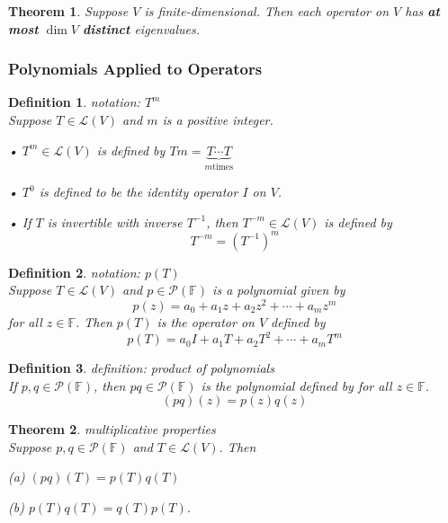 \documentclass{article}
\newtheorem{theorem}{Theorem}[subsection]
\newtheorem{definition}{Definition}[subsection]
\newcommand{\FF}{\mathbb{F}}
\begin{document}
\begin{CJK}{UTF8}{gkai}
\begin{theorem}
    Suppose $V$ is finite-dimensional. Then each operator on $V$ has \textbf{at most} $\dim V$ \textbf{distinct} eigenvalues.
\end{theorem}
\subsubsection{Polynomials Applied to Operators}

\begin{definition}
    notation: $T^m$\\

    Suppose $T \in \mathcal{L}(V)$ and $m$ is a positive integer.

    • $T^m \in\mathcal{L}(V)$ is defined by $Tm = \underset{m \text{times}}{\underbrace{T\cdots T}}$

    • $T^0$ is defined to be the identity operator $I$ on $V$.

    • If $T$ is invertible with inverse $T^{-1}$, then $T^{-m} \in \mathcal{L}(V)$ is defined by
    \[T^{-m} = (T^{-1})^{m}\]
\end{definition}

\begin{definition}
    notation: $p(T)$\\

    Suppose $T \in \mathcal{L}(V)$ and $p \in \mathcal{P}(\FF)$ is a polynomial given by
    \[p(z) = a_0 +a_1 z + a_2 z^2 +\cdots +a_m z^m\]
    for all $z \in \FF$. Then $p(T)$ is the operator on $V$ defined by
    \[p(T) = a_0 I +a_1 T+a_2 T^2 +\cdots +a_m T^m\]
\end{definition}

\begin{definition}
    definition: product of polynomials\\

    If $p, q \in \mathcal{P}(\FF)$, then $pq \in \mathcal{P}(\FF)$ is the polynomial defined by for all $z \in \FF$.
    \[(pq)(z) = p(z)q(z)\]
\end{definition}

\begin{theorem}
    multiplicative properties\\

    Suppose $p,q \in \mathcal{P}(\FF)$ and $T \in \mathcal{L}(V)$. Then

    (a) $(pq)(T) = p(T)q(T)$
    
    (b) $p(T)q(T) = q(T)p(T)$.
\end{theorem}


\end{CJK}
\end{document}
